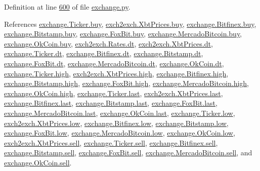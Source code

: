 Definition at line \hyperlink{exchange_8py_source_l00600}{600} of file \hyperlink{exchange_8py_source}{exchange.\+py}.



References \hyperlink{exchange_8py_source_l00058}{exchange.\+Ticker.\+buy}, \hyperlink{exch2exch_8py_source_l00059}{exch2exch.\+Xbt\+Prices.\+buy}, \hyperlink{exchange_8py_source_l00323}{exchange.\+Bitfinex.\+buy}, \hyperlink{exchange_8py_source_l00392}{exchange.\+Bitstamp.\+buy}, \hyperlink{exchange_8py_source_l00464}{exchange.\+Fox\+Bit.\+buy}, \hyperlink{exchange_8py_source_l00526}{exchange.\+Mercado\+Bitcoin.\+buy}, \hyperlink{exchange_8py_source_l00591}{exchange.\+Ok\+Coin.\+buy}, \hyperlink{exch2exch_8py_source_l00028}{exch2exch.\+Rates.\+dt}, \hyperlink{exch2exch_8py_source_l00057}{exch2exch.\+Xbt\+Prices.\+dt}, \hyperlink{exchange_8py_source_l00057}{exchange.\+Ticker.\+dt}, \hyperlink{exchange_8py_source_l00330}{exchange.\+Bitfinex.\+dt}, \hyperlink{exchange_8py_source_l00399}{exchange.\+Bitstamp.\+dt}, \hyperlink{exchange_8py_source_l00463}{exchange.\+Fox\+Bit.\+dt}, \hyperlink{exchange_8py_source_l00533}{exchange.\+Mercado\+Bitcoin.\+dt}, \hyperlink{exchange_8py_source_l00598}{exchange.\+Ok\+Coin.\+dt}, \hyperlink{exchange_8py_source_l00060}{exchange.\+Ticker.\+high}, \hyperlink{exch2exch_8py_source_l00061}{exch2exch.\+Xbt\+Prices.\+high}, \hyperlink{exchange_8py_source_l00325}{exchange.\+Bitfinex.\+high}, \hyperlink{exchange_8py_source_l00394}{exchange.\+Bitstamp.\+high}, \hyperlink{exchange_8py_source_l00466}{exchange.\+Fox\+Bit.\+high}, \hyperlink{exchange_8py_source_l00528}{exchange.\+Mercado\+Bitcoin.\+high}, \hyperlink{exchange_8py_source_l00593}{exchange.\+Ok\+Coin.\+high}, \hyperlink{exchange_8py_source_l00062}{exchange.\+Ticker.\+last}, \hyperlink{exch2exch_8py_source_l00063}{exch2exch.\+Xbt\+Prices.\+last}, \hyperlink{exchange_8py_source_l00327}{exchange.\+Bitfinex.\+last}, \hyperlink{exchange_8py_source_l00396}{exchange.\+Bitstamp.\+last}, \hyperlink{exchange_8py_source_l00468}{exchange.\+Fox\+Bit.\+last}, \hyperlink{exchange_8py_source_l00530}{exchange.\+Mercado\+Bitcoin.\+last}, \hyperlink{exchange_8py_source_l00595}{exchange.\+Ok\+Coin.\+last}, \hyperlink{exchange_8py_source_l00061}{exchange.\+Ticker.\+low}, \hyperlink{exch2exch_8py_source_l00062}{exch2exch.\+Xbt\+Prices.\+low}, \hyperlink{exchange_8py_source_l00326}{exchange.\+Bitfinex.\+low}, \hyperlink{exchange_8py_source_l00395}{exchange.\+Bitstamp.\+low}, \hyperlink{exchange_8py_source_l00467}{exchange.\+Fox\+Bit.\+low}, \hyperlink{exchange_8py_source_l00529}{exchange.\+Mercado\+Bitcoin.\+low}, \hyperlink{exchange_8py_source_l00594}{exchange.\+Ok\+Coin.\+low}, \hyperlink{exch2exch_8py_source_l00058}{exch2exch.\+Xbt\+Prices.\+sell}, \hyperlink{exchange_8py_source_l00059}{exchange.\+Ticker.\+sell}, \hyperlink{exchange_8py_source_l00324}{exchange.\+Bitfinex.\+sell}, \hyperlink{exchange_8py_source_l00393}{exchange.\+Bitstamp.\+sell}, \hyperlink{exchange_8py_source_l00465}{exchange.\+Fox\+Bit.\+sell}, \hyperlink{exchange_8py_source_l00527}{exchange.\+Mercado\+Bitcoin.\+sell}, and \hyperlink{exchange_8py_source_l00592}{exchange.\+Ok\+Coin.\+sell}.


